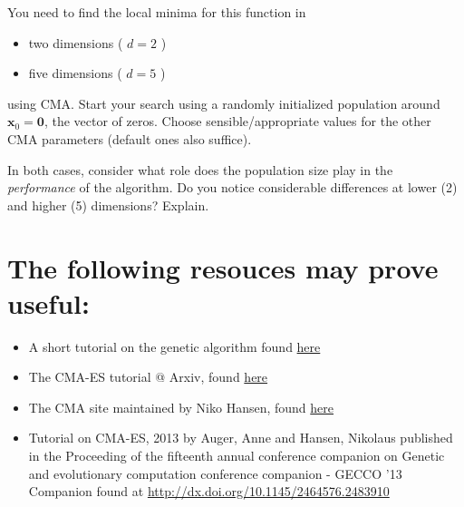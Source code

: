 \documentclass[11pt]{article}
\begin{document}
You need to find the local minima for this function in
\begin{itemize}
\item two dimensions ( \(d = 2\) )
\item five dimensions ( \(d = 5\) )
\end{itemize}
using CMA. Start your search using a randomly initialized population around \(\mathbf{x}_0 = \mathbf{0}\), the vector of zeros. Choose sensible/appropriate values for
the other CMA parameters (default ones also suffice).

In both cases, consider what role does the population size play in the
\emph{performance} of the algorithm. Do you notice considerable differences at lower
(2) and higher (5) dimensions? Explain.

\section{The following resouces may prove useful:}
\label{sec:references}
\begin{itemize}
\item A short tutorial on the genetic algorithm found \href{http://web.cs.ucdavis.edu/\~vemuri/classes/ecs271/Genetic\%2520Algorithms\%2520Short\%2520Tutorial.htm}{here}
\item The CMA-ES tutorial @ Arxiv, found \href{https://arxiv.org/pdf/1604.00772.pdf}{here}
\item The CMA site maintained by Niko Hansen, found \href{http://cma.gforge.inria.fr/index.html}{here}
\item Tutorial on CMA-ES, 2013 by Auger, Anne and Hansen, Nikolaus published in the
Proceeding of the fifteenth annual conference companion on Genetic and
evolutionary computation conference companion - GECCO ’13 Companion found at \url{http://dx.doi.org/10.1145/2464576.2483910}
\end{itemize}
\end{document}
